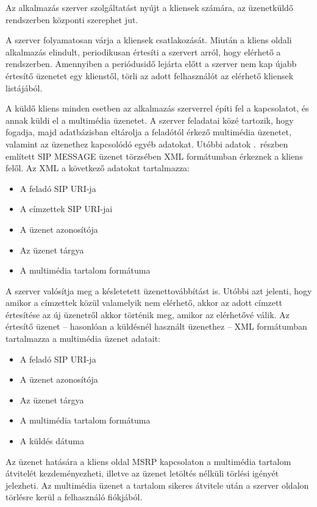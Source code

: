 Az alkalmazás szerver szolgáltatást nyújt a kliensek számára, az üzenetküldő rendszerben központi szerephet jut.

A szerver folyamatosan várja a kliensek csatlakozását. Miután a kliens oldali alkalmazás elindult, periodikusan értesíti a szervert arról, hogy elérhető a rendszerben. Amennyiben a periódusidő lejárta előtt a szerver nem kap újabb értesítő üzenetet egy klienstől, törli az adott felhasználót az elérhető kliensek listájából. 

A küldő kliens minden esetben az alkalmazás szerverrel építi fel a kapcsolatot, és annak küldi el a multimédia üzenetet. A szerver feladatai közé tartozik, hogy fogadja, majd adatbázisban eltárolja a feladótól érkező multimédia üzenetet, valamint az üzenethez kapcsolódó egyéb adatokat. Utóbbi adatok .~részben említett SIP MESSAGE üzenet törzsében XML formátumban érkeznek a kliens felől. Az XML a következő adatokat tartalmazza: 

\begin{itemize}\itemsep1pt
\item	A feladó SIP URI-ja
\item A címzettek SIP URI-jai
\item A üzenet azonosítója
\item Az üzenet tárgya
\item A multimédia tartalom formátuma
\end{itemize}

A szerver valósítja meg a késletetett üzenettovábbítást is. Utóbbi azt jelenti, hogy amikor a címzettek közül valamelyik nem elérhető, akkor az adott címzett értesítése az új üzenetről akkor történik meg, amikor az elérhetővé válik. Az értesítő üzenet -- hasonlóan a küldésnél használt üzenethez -- XML formátumban tartalmazza a multimédia üzenet adatait:

\begin{itemize}\itemsep1pt
\item	A feladó SIP URI-ja
\item A üzenet azonosítója
\item Az üzenet tárgya
\item A multimédia tartalom formátuma
\item A küldés dátuma
\end{itemize}

Az üzenet hatására a kliens oldal MSRP kapcsolaton a multimédia tartalom átvitelét kezdeményezheti, illetve az üzenet letöltés nélküli törlési igényét jelezheti. Az multimédia üzenet a tartalom sikeres átvitele után a szerver oldalon törlésre kerül a felhasználó fiókjából.

